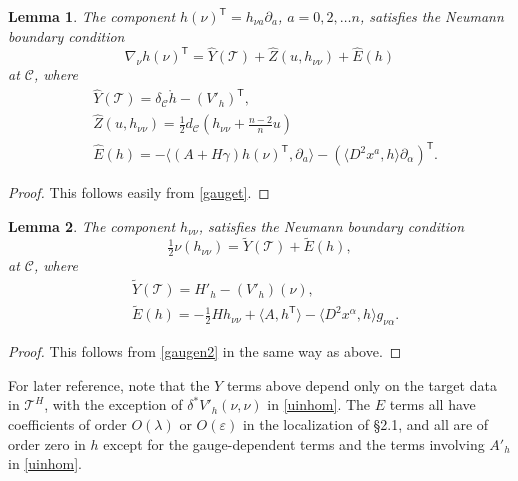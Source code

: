 \documentclass[10pt]{amsart}
\renewcommand{\a}{\alpha}
\newcommand{\g}{\gamma}
\renewcommand{\d}{\delta}
\newcommand{\e}{\varepsilon}
\renewcommand{\l}{\lambda}
\newcommand{\cC}{{\mathcal C}}
\newcommand{\cT}{{\mathcal T}}
\newcommand{\tT}{\mathsf{T}}
\newcommand{\be}{\begin{equation}}
\newcommand{\ee}{\end{equation}}
\newcommand{\p}{\partial}
\renewcommand{\hat}{\widehat}
\newcommand{\<}{\langle}
\renewcommand{\>}{\rangle}
\newcommand{\w}{\widetilde}
\theoremstyle{plain}
\newtheorem{lemma}{Lemma}[section]
\theoremstyle{remark}
\theoremstyle{definition}
\numberwithin{equation}{section}
\begin{document}
\begin{lemma} \label{nuTlemma}
The component $h(\nu)^{\tT} = h_{\nu a} \p_a$, $a = 0, 2, \dots n$, satisfies the Neumann boundary condition 
\be \label{hnua}
\nabla_{\nu} h(\nu)^{\tT} = \hat Y(\cT) + \hat Z(u, h_{\nu \nu}) + \hat E(h)
\ee
at $\cC$, where 
\be \label{hnuaterms}
\begin{split}
&\hat Y(\cT) = \d_{\cC}\ring{h} - (V'_h)^{\tT},\\
&\hat Z(u, h_{\nu \nu}) = \tfrac{1}{2}d_{\cC}(h_{\nu\nu} + \tfrac{n-2}{n}u) \\ 
&\hat E(h) =  -\<(A + H\g)h(\nu)^{\tT}, \p_a\> - (\<D^2 x^a, h\>\p_{\a})^{\tT}.
\end{split}
\ee 
\end{lemma}

\begin{proof}
This follows easily from \eqref{gauget}. 

\end{proof}


\begin{lemma} \label{nunulemma}
The component $h_{\nu \nu}$, satisfies the Neumann boundary condition 
\be \label{hnunu}
\tfrac{1}{2}\nu (h_{\nu\nu})= \w Y(\cT) + \w E(h), 
\ee
at $\cC$, where 
\be \label{hnunuaterms}
\begin{split}
&\w Y(\cT) = H'_h - (V'_h)(\nu),\\
&\w E(h) =  -\tfrac{1}{2}H h_{\nu\nu} + \<A, h^{\tT}\> - \<D^2 x^{\a}, h\>g_{\nu \a}.
\end{split}
\ee 
\end{lemma}

\begin{proof}
This follows from \eqref{gaugen2} in the same way as above. 

\end{proof}

  
    For later reference, note that the $Y$ terms above depend only on the target data in $\cT^H$, with the exception of $\d^*V'_h(\nu, \nu)$ in \eqref{uinhom}. 
The $E$ terms all have coefficients of order $O(\l)$ or $O(\e)$ in the localization of \S 2.1, and all are of order zero in $h$ except for the gauge-dependent 
terms and the terms involving $A'_h$ in \eqref{uinhom}. 
 
\end{document}
